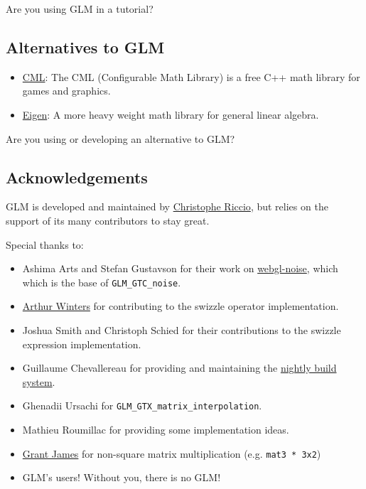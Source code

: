 \documentclass{scrartcl}
\numberwithin{figure}{subsection}
\begin{document}
Are you using GLM in a tutorial?  


\subsection{Alternatives to GLM}

\begin{itemize}
  \item \href{http://cmldev.net/}{CML}: The CML (Configurable Math Library) is a free C++ math library for games and graphics.
  \item \href{http://eigen.tuxfamily.org/}{Eigen}: A more heavy weight math library for general linear algebra.
\end{itemize}

Are you using or developing an alternative to GLM?  

\subsection{Acknowledgements}

GLM is developed and maintained by \href{http://www.g-truc.net}{Christophe Riccio}, but relies on the support of its many contributors to stay great.

Special thanks to:

\begin{itemize}
  \item Ashima Arts and Stefan Gustavson for their work on \href{https://github.com/ashima/webgl-noise}{webgl-noise}, which which is the base of \verb|GLM_GTC_noise|.
  \item \href{http://athile.net/library/wiki/index.php?title=Athile_Technologies}{Arthur Winters} for contributing to the swizzle operator implementation.
  \item Joshua Smith and Christoph Schied for their contributions to the swizzle expression implementation.
  \item Guillaume Chevallereau for providing and maintaining the \href{http://my.cdash.org/index.php?project=GLM}{nightly build system}.
  \item Ghenadii Ursachi for \verb|GLM_GTX_matrix_interpolation|.
  \item Mathieu Roumillac for providing some implementation ideas.
  \item \href{http://www.zeuscmd.com/}{Grant James} for non-square matrix multiplication (e.g. \verb|mat3 * 3x2|)
  \item GLM's users!  Without you, there is no GLM!
\end{itemize}
\end{document}
